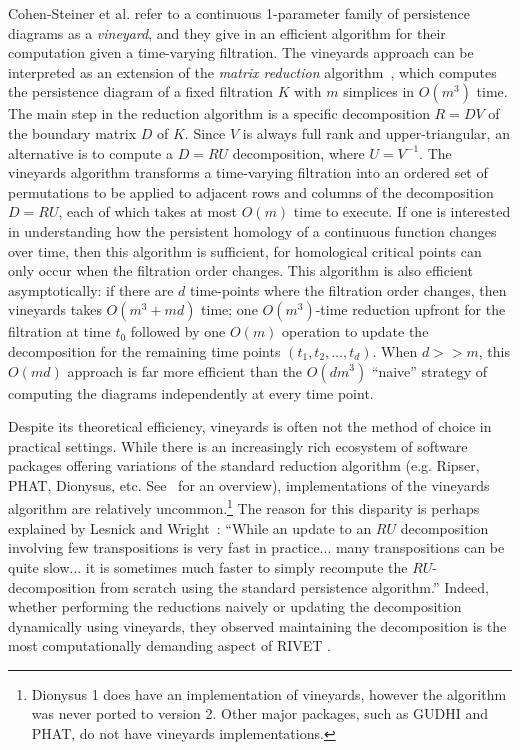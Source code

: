 \documentclass{article} %
\begin{document}
Cohen-Steiner et al. refer to a continuous 1-parameter family of persistence diagrams as a \emph{vineyard}, and they give in \cite{cohen2006vines} an efficient algorithm for their computation given a time-varying filtration. 
The vineyards approach can be interpreted as an extension of the \emph{matrix reduction} algorithm~\cite{zomorodian2005computing}, which computes the persistence diagram of a fixed filtration $K$ with $m$ simplices in $O(m^3)$ time.
The main step in the reduction algorithm is a specific decomposition $R = D V$ of the boundary matrix $D$ of $K$. 
Since $V$ is always full rank and upper-triangular, an alternative is to compute a $D = RU$ decomposition, where $U = V^{-1}$. 
The vineyards algorithm transforms a time-varying filtration into an ordered set of permutations to be applied to adjacent rows and columns of the decomposition $D = RU$, each of which takes at most $O(m)$ time to execute. If one is interested in understanding how the persistent homology of a continuous function changes over time, then this algorithm is sufficient, for  homological critical points can only occur when the filtration order changes. 
This algorithm is also efficient  asymptotically: if there are $d$ time-points where the filtration order changes, then   vineyards   takes $O(m^3 + md)$ time; one $O(m^3)$-time reduction upfront for the filtration at time $t_0$ followed by one $O(m)$ operation to update the decomposition for the remaining time points $(t_1, t_2, \dots, t_d)$. When $d >> m$, this $O(md)$ approach is far more efficient than the $O(dm^3)$  ``naive'' strategy of computing the diagrams independently at every time point.

Despite its theoretical efficiency, vineyards is often not the method of choice in practical settings. 
While there is an increasingly rich ecosystem of software packages offering variations of the standard reduction algorithm (e.g. Ripser, PHAT, Dionysus, etc. See~\cite{otter2017roadmap} for an overview), implementations of the vineyards algorithm are relatively uncommon.\footnote{Dionysus 1 does have an implementation of vineyards, however the algorithm was never ported to version 2. Other major packages, such as GUDHI and PHAT, do not have vineyards implementations.} 
The reason for this disparity is perhaps explained by Lesnick and Wright~\cite{lesnick2015interactive}: ``While an update to an $RU$ decomposition involving few transpositions is very fast in practice... many transpositions can be quite slow... it is sometimes much faster to simply recompute the $RU$-decomposition from scratch using the standard persistence algorithm.'' Indeed, whether performing the reductions naively or updating the decomposition dynamically using vineyards, they observed maintaining the decomposition is the most computationally demanding aspect of RIVET \cite{rivet}.
\end{document}
